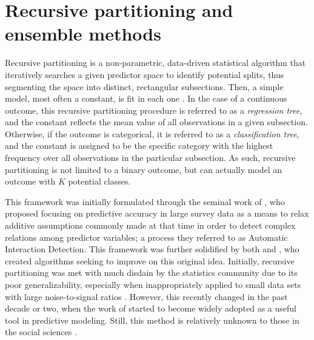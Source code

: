 
\chapter{Recursive partitioning and ensemble methods} %

\label{ch:methods} %


	Recursive partitioning is a non-parametric, data-driven statistical algorithm that iteratively searches a given predictor space to identify potential splits, thus segmenting the space into distinct, rectangular subsections. Then, a simple model, most often a constant, is fit in each one \cite{hastie2009elements}. In the case of a continuous outcome, this recursive partitioning procedure is referred to as a \textit{regression tree}, and the constant reflects the mean value of all observations in a given subsection. Otherwise, if the outcome is categorical, it is referred to as a \textit{classification tree}, and the constant is assigned to be the specific category with the highest frequency over all observations in the particular subsection. As such, recursive partitioning is not limited to a binary outcome, but can actually model an outcome with $K$ potential classes.


	This framework was initially formulated through the seminal work of , who proposed focusing on predictive accuracy in large survey data as a means to relax additive assumptions commonly made at that time in order to detect complex relations among predictor variables; a process they referred to as Automatic Interaction Detection. This framework was further solidified by both  and , who created algorithms seeking to improve on this original idea. Initially, recursive partitioning was met with much disdain by the statistics community due to its poor generalizability, especially when inappropriately applied to small data sets with large noise-to-signal ratios \cite{hastie2013}. However, this recently changed in the past decade or two, when the work of  started to become widely adopted as a useful tool in predictive modeling. Still, this method is relatively unknown to those in the social sciences \cite{mcardle2013}.


